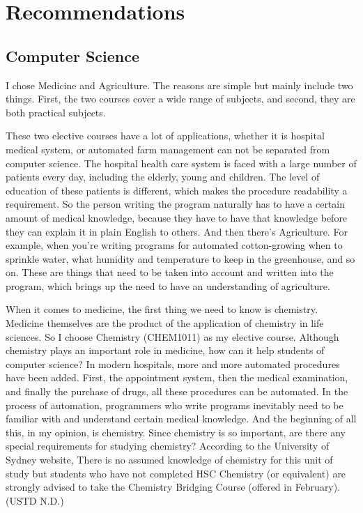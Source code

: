 \documentclass[12pt]{article}
\begin{document}
\newpage
\section{Recommendations}

\subsection{Computer Science}
I chose Medicine and Agriculture. The reasons are simple but mainly include two things. First, the two courses cover a wide range of subjects, and second, they are both practical subjects.

These two elective courses have a lot of applications, whether it is hospital medical system, or automated farm management can not be separated from computer science. The hospital health care system is faced with a large number of patients every day, including the elderly, young and children. The level of education of these patients is different, which makes the procedure readability a requirement. So the person writing the program naturally has to have a certain amount of medical knowledge, because they have to have that knowledge before they can explain it in plain English to others. And then there's Agriculture. For example, when you're writing programs for automated cotton-growing when to sprinkle water, what humidity and temperature to keep in the greenhouse, and so on. These are things that need to be taken into account and written into the program, which brings up the need to have an understanding of agriculture.

When it comes to medicine, the first thing we need to know is chemistry. Medicine themselves are the product of the application of chemistry in life sciences. So I choose Chemistry (CHEM1011) as my elective course. Although chemistry plays an important role in medicine, how can it help students of computer science? In modern hospitals, more and more automated procedures have been added. First, the appointment system, then the medical examination, and finally the purchase of drugs, all these procedures can be automated. In the process of automation, programmers who write programs inevitably need to be familiar with and understand certain medical knowledge. And the beginning of all this, in my opinion, is chemistry. Since chemistry is so important, are there any special requirements for studying chemistry? According to the University of Sydney website, There is no assumed knowledge of chemistry for this unit of study but students who have not completed HSC Chemistry (or equivalent) are strongly advised to take the Chemistry Bridging Course (offered in February). (USTD N.D.)
\end{document}
